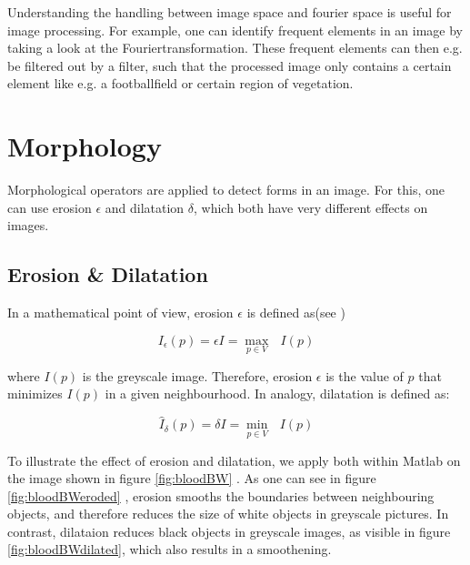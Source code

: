 Understanding the handling between image space and fourier space is useful for image processing. For example, one can identify frequent elements in an image by taking a look at the Fouriertransformation. These frequent elements can then e.g. be filtered out by a filter, such that the processed image only contains a certain element like e.g. a footballfield or certain region of vegetation.



\section{Morphology}
Morphological operators are applied to detect forms in an image. For this, one can use erosion $\epsilon$ and dilatation $\delta$, which both have very different effects on images. 

\subsection{Erosion \& Dilatation}
In a mathematical point of view, erosion $\epsilon$ is defined as(see \protect\footnotemark)  
 

\begin{equation*}
I_{\epsilon}(p)=\epsilon I = \underset{p \in V}\max \text{ } I(p)
\end{equation*}

where $I(p)$ is the greyscale image. Therefore, erosion $\epsilon$ is the value of $p$ that minimizes $I(p)$ in a given neighbourhood. In analogy, dilatation is defined as:

\begin{equation*}
\hat{I}_{\delta}(p)=\delta I = \underset{p \in V}\min \text{ } I(p)
\end{equation*}


To illustrate the effect of erosion and dilatation, we apply both within Matlab on the image shown in figure \ref{fig:bloodBW} . As one can see in figure \ref{fig:bloodBWeroded} , erosion smooths the boundaries between neighbouring objects, and therefore reduces the size of white objects in greyscale pictures. In contrast, dilataion reduces black objects in greyscale images, as visible in figure \ref{fig:bloodBWdilated}, which also results in a smoothening.

